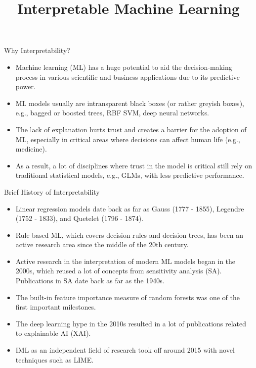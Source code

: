 \documentclass[11pt,compress,t,notes=noshow, xcolor=table]{beamer}
\title{Interpretable Machine Learning}
\institute{\href{https://compstat-lmu.github.io/lecture_iml/}{compstat-lmu.github.io/lecture\_iml}}
\date{}
\begin{document}






\begin{vbframe}{Why Interpretability?}

\begin{itemize}
  \item  Machine learning (ML) has a huge potential to aid the decision-making process in various scientific and business applications due to its predictive power.
  \item ML models usually are intransparent black boxes (or rather greyish boxes), 
  e.g., bagged or boosted trees, RBF SVM, deep neural networks.
  \item The lack of explanation hurts trust and creates a barrier for the adoption of ML, especially in critical areas where decisions can affect human life (e.g., medicine).
  \item As a result, a lot of disciplines where trust in the model is critical still rely on traditional statistical models, e.g., GLMs, with less predictive performance.
\end{itemize}

\end{vbframe}



\begin{vbframe}{Brief History of Interpretability}
\begin{itemize}
\item Linear regression models date back as far as Gauss (1777 - 1855), Legendre (1752 - 1833), and Quetelet (1796 - 1874).
\item Rule-based ML, which covers decision rules and decision trees, has been an active research area since the middle of the 20th century.
\item Active research in the interpretation of modern ML models began in the 2000s, which reused a lot of concepts from sensitivity analysis (SA). Publications in SA date back as far as the 1940s.
\item The built-in feature importance measure of random forests was one of the first important milestones.
\item The deep learning hype in the 2010s resulted in a lot of publications related to explainable AI (XAI).
\item IML as an independent field of research took off around 2015 with novel techniques such as LIME. 
\end{itemize}
\end{vbframe}
\end{document}
